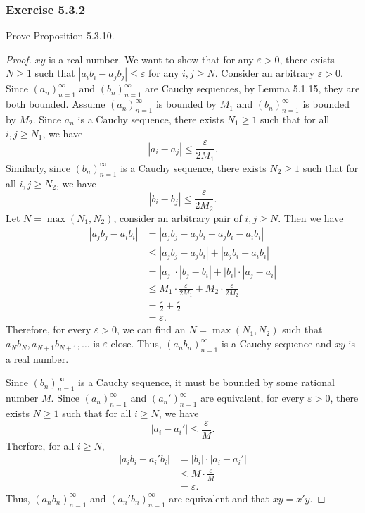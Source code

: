 \documentclass[12pt, letter]{article}
\newcommand{\an}{$(a_n)_{n=1}^\infty$ }
\newcommand{\bn}{$(b_n)_{n=1}^\infty$ }
\begin{document}
\subsubsection*{Exercise 5.3.2}
Prove Proposition 5.3.10.
\begin{proof}
    $xy$ is a real number. We want to show that for any $\varepsilon>0$, there exists $N\geq 1$ such that $|a_i b_i-a_j b_j|\leq\varepsilon$ for any $i,j\geq N$. Consider an 
    arbitrary $\varepsilon>0$. Since \an and \bn are Cauchy sequences, by Lemma 5.1.15, they are both bounded. Assume \an is bounded by $M_1$ and \bn is bounded by $M_2$. Since $a_n$ is a Cauchy sequence, there exists $N_1\geq 1$ such that
    for all $i,j\geq N_1$, we have 
    \begin{equation*}
        |a_i-a_j|\leq \frac{\varepsilon}{2M_1}.
    \end{equation*} 
    Similarly, since \bn is a Cauchy sequence, there exists $N_2\geq 1$ such that for all $i,j\geq N_2$, we have 
    \begin{equation*}
        |b_i-b_j|\leq \frac{\varepsilon}{2M_2}.
    \end{equation*}
    Let $N=\max(N_1,N_2)$, consider an arbitrary pair of $i,j\geq N$. Then we have 
    \begin{equation*}
        \begin{aligned}
            |a_j b_j-a_i b_i|&=|a_j b_j-a_j b_i+a_j b_i-a_i b_i|\\
            &\leq |a_j b_j-a_j b_i|+|a_j b_i-a_i b_i|\\
            &=|a_j|\cdot |b_j-b_i|+|b_i|\cdot |a_j-a_i|\\
            &\leq M_1\cdot \frac{\varepsilon}{2M_1}+M_2\cdot\frac{\varepsilon}{2M_2}\\
            &=\frac{\varepsilon}{2}+\frac{\varepsilon}{2}\\
            &=\varepsilon.
        \end{aligned}
    \end{equation*}
    Therefore, for every $\varepsilon>0$, we can find an $N=\max(N_1,N_2)$ such that $a_N b_N,a_{N+1}b_{N+1},\dotsc$ is $\varepsilon$-close. Thus, $(a_n b_n)_{n=1}^\infty$
    is a Cauchy sequence and $xy$ is a real number.

    Since \bn is a Cauchy sequence, it must be bounded by some rational number $M$. Since \an and $(a_n')_{n=1}^\infty$ are equivalent, for every $\varepsilon>0$, there exists $N\geq 1$ such that 
    for all $i\geq N$, we have 
    \begin{equation*}
        |a_i-a_i'|\leq \frac{\varepsilon}{M}.
    \end{equation*}
    Therfore, for all $i\geq N$, 
    \begin{equation*}
        \begin{aligned}
            |a_i b_i-a_i' b_i|&=|b_i|\cdot |a_i-a_i'|\\
            &\leq M\cdot \frac{\varepsilon}{M}\\
            &=\varepsilon.
        \end{aligned}
    \end{equation*}
    Thus, $(a_n b_n)_{n=1}^\infty$ and $(a_n' b_n)_{n=1}^\infty$ are equivalent and that $xy=x'y$. 
\end{proof}
\end{document}
